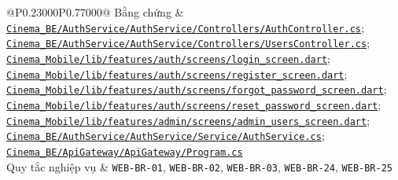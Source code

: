 \begin{longtable}{@{}P{0.23000\SRSWidth}P{0.77000\SRSWidth}@{}}
Bằng chứng & \href{../../../Cinema\_BE/AuthService/AuthService/Controllers/AuthController.cs}{\texttt{Cinema\_\allowbreak{}BE/\allowbreak{}Auth\allowbreak{}Service/\allowbreak{}Auth\allowbreak{}Service/\allowbreak{}Controll\allowbreak{}ers/\allowbreak{}Auth\allowbreak{}Controll\allowbreak{}er.\allowbreak{}cs}}; \href{../../../Cinema\_BE/AuthService/AuthService/Controllers/UsersController.cs}{\texttt{Cinema\_\allowbreak{}BE/\allowbreak{}Auth\allowbreak{}Service/\allowbreak{}Auth\allowbreak{}Service/\allowbreak{}Controll\allowbreak{}ers/\allowbreak{}Users\allowbreak{}Controll\allowbreak{}er.\allowbreak{}cs}}; \href{../../../Cinema\_Mobile/lib/features/auth/screens/login\_screen.dart}{\texttt{Cinema\_\allowbreak{}Mobile/\allowbreak{}lib/\allowbreak{}features\allowbreak{}/\allowbreak{}auth/\allowbreak{}screens/\allowbreak{}login\_\allowbreak{}screen.\allowbreak{}dart}}; \href{../../../Cinema\_Mobile/lib/features/auth/screens/register\_screen.dart}{\texttt{Cinema\_\allowbreak{}Mobile/\allowbreak{}lib/\allowbreak{}features\allowbreak{}/\allowbreak{}auth/\allowbreak{}screens/\allowbreak{}register\allowbreak{}\_\allowbreak{}screen.\allowbreak{}dart}}; \href{../../../Cinema\_Mobile/lib/features/auth/screens/forgot\_password\_screen.dart}{\texttt{Cinema\_\allowbreak{}Mobile/\allowbreak{}lib/\allowbreak{}features\allowbreak{}/\allowbreak{}auth/\allowbreak{}screens/\allowbreak{}forgot\_\allowbreak{}password\allowbreak{}\_\allowbreak{}screen.\allowbreak{}dart}}; \href{../../../Cinema\_Mobile/lib/features/auth/screens/reset\_password\_screen.dart}{\texttt{Cinema\_\allowbreak{}Mobile/\allowbreak{}lib/\allowbreak{}features\allowbreak{}/\allowbreak{}auth/\allowbreak{}screens/\allowbreak{}reset\_\allowbreak{}password\allowbreak{}\_\allowbreak{}screen.\allowbreak{}dart}}; \href{../../../Cinema\_Mobile/lib/features/admin/screens/admin\_users\_screen.dart}{\texttt{Cinema\_\allowbreak{}Mobile/\allowbreak{}lib/\allowbreak{}features\allowbreak{}/\allowbreak{}admin/\allowbreak{}screens/\allowbreak{}admin\_\allowbreak{}users\_\allowbreak{}screen.\allowbreak{}dart}}; \href{../../../Cinema\_BE/AuthService/AuthService/Service/AuthService.cs}{\texttt{Cinema\_\allowbreak{}BE/\allowbreak{}Auth\allowbreak{}Service/\allowbreak{}Auth\allowbreak{}Service/\allowbreak{}Service/\allowbreak{}Auth\allowbreak{}Service.\allowbreak{}cs}}; \href{../../../Cinema\_BE/ApiGateway/ApiGateway/Program.cs}{\texttt{Cinema\_\allowbreak{}BE/\allowbreak{}Api\allowbreak{}Gateway/\allowbreak{}Api\allowbreak{}Gateway/\allowbreak{}Program.\allowbreak{}cs}} \\[3pt]
Quy tắc nghiệp vụ & \texttt{WEB-\allowbreak{}BR-\allowbreak{}01}, \texttt{WEB-\allowbreak{}BR-\allowbreak{}02}, \texttt{WEB-\allowbreak{}BR-\allowbreak{}03}, \texttt{WEB-\allowbreak{}BR-\allowbreak{}24}, \texttt{WEB-\allowbreak{}BR-\allowbreak{}25} \\[3pt]

\end{longtable}
